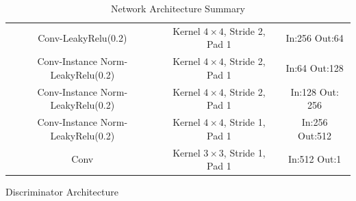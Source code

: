 \documentclass[10pt,twocolumn,letterpaper]{article}
\begin{document}
\begin{table}[ht!]
\begin{subtable}[h]{\textwidth}
\begin{tabular}{ |c|c|c| }
 \hline
Conv-LeakyRelu(0.2) & Kernel $4 \times 4$, Stride 2, Pad 1 &  In:256 Out:64\\ 
 Conv-Instance Norm-LeakyRelu(0.2) & Kernel $4 \times 4$, Stride 2, Pad 1 &  In:64 Out:128\\
 Conv-Instance Norm-LeakyRelu(0.2) & Kernel $4 \times 4$, Stride 2, Pad 1 &  In:128 Out: 256\\
  Conv-Instance Norm-LeakyRelu(0.2) & Kernel $4 \times 4$, Stride 1, Pad 1 &  In:256 Out:512\\
   Conv & Kernel $3 \times 3$, Stride 1, Pad 1 &  In:512 Out:1\\
\hline
\end{tabular}
\label{table:discriminator}
\caption{Discriminator Architecture}
\end{subtable}
\caption{Network Architecture Summary}
\label{table:architecture}
\end{table}

%     
\end{document}
